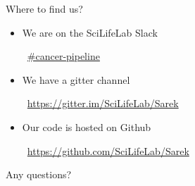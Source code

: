 \documentclass{beamer}
\begin{document}
\begin{frame}{Where to find us?}
	\begin{itemize}
		\item We are on the SciLifeLab Slack

		\faSlack\ \href{https://scilifelab.slack.com/}{\#cancer-pipeline}
		\pause
		\item We have a gitter channel

		\faGitter\ \url{https://gitter.im/SciLifeLab/Sarek}
		\pause
		\item Our code is hosted on Github

		\faGithub\ \url{https://github.com/SciLifeLab/Sarek}
	\end{itemize}
\end{frame}



\begin{frame}{Any questions?}
\end{frame}
\end{document}
